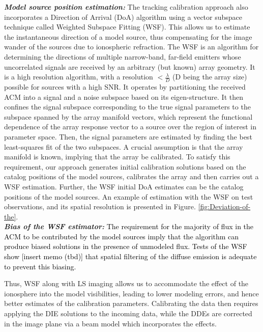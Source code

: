 \documentclass{aa}
\begin{document}
\textbf{\emph{Model source position estimation:}}\emph{ }The tracking
calibration approach also incorporates a Direction of Arrival (DoA)
algorithm using a vector subspace technique called Weighted Subspace
Fitting (WSF)\cite{viberg1991detection}. This allows us to estimate
the instantaneous direction of a model source, thus compensating for
the image wander of the sources due to ionospheric refraction. The
WSF is an algorithm for determining the directions of multiple narrow-band,
far-field emitters whose uncorrelated signals are received by an arbitrary
(but known) array geometry. It is a high resolution algorithm, with
a resolution $<\frac{\lambda}{D}$ (D being the array size) possible
for sources with a high SNR. It operates by partitioning the received
ACM into a signal and a noise subspace based on its eigen-structure.
It then confines the signal subspace corresponding to the true signal
parameters to the subspace spanned by the array manifold vectors,
which represent the functional dependence of the array response vector
to a source over the region of interest in parameter space. Then,
the signal parameters are estimated by finding the best least-squares
fit of the two subspaces. A crucial assumption is that the array manifold
is known, implying that the array be calibrated. To satisfy this requirement,
our approach generates initial calibration solutions based on the
catalog positions of the model sources, calibrates the array and then
carries out a WSF estimation. Further, the WSF initial DoA estimates
can be the catalog positions of the model sources. An example of estimation
with the WSF on test observations, and its spatial resolution is presented
in Figure. \ref{fig:Deviation-of-the}.\\
\textbf{\emph{Bias of the WSF estimator:}} \textcolor{black}{The requirement
for the majority of flux in the ACM to be contributed by the model
sources imply that the algorithm can produce biased solutions in the
presence of unmodeled flux. Tests of the WSF show {[}insert memo (tbd){]}
that spatial filtering of the diffuse emission is adequate to prevent
this biasing.}

Thus, WSF along with LS imaging allows us to accommodate the effect
of the ionosphere into the model visibilities, leading to lower modeling
errors, and hence better estimates of the calibration parameters.
Calibrating the data then requires applying the DIE solutions to the
incoming data, while the DDEs are corrected in the image plane via
a beam model which incorporates the effects.
\end{document}
